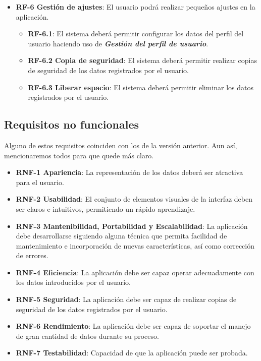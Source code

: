 \begin{itemize}
\begin{itemize}
\begin{itemize}
				\end{itemize}
		\end{itemize}
	\item \textbf{RF-6 Gestión de ajustes}: El usuario podrá realizar pequeños ajustes en la aplicación.
		\begin{itemize}
			\item \textbf{RF-6.1}: El sistema deberá permitir configurar los datos del perfil del usuario haciendo uso de \textbf{\textit{Gestión del perfil de usuario}}.
			\item \textbf{RF-6.2 Copia de seguridad}: El sistema deberá permitir realizar copias de seguridad de los datos registrados por el usuario.
			\item \textbf{RF-6.3 Liberar espacio}: El sistema deberá permitir eliminar los datos registrados por el usuario.
		\end{itemize}
\end{itemize}
\subsection{Requisitos no funcionales}
Alguno de estos requisitos coinciden con los de la versión anterior. Aun así, mencionaremos todos para que quede más claro.
\begin{itemize}
	\item \textbf{RNF-1 Apariencia}: La representación de los datos deberá ser atractiva para el usuario.
	\item \textbf{RNF-2 Usabilidad}: El conjunto de elementos visuales de la interfaz deben ser claros e intuitivos, permitiendo un rápido aprendizaje.
	\item \textbf{RNF-3  Mantenibilidad, Portabilidad y Escalabilidad}: La aplicación debe desarrollarse siguiendo alguna técnica que permita facilidad de mantenimiento e incorporación de nuevas características, así como corrección de errores.
	\item \textbf{RNF-4 Eficiencia}: La aplicación debe ser capaz operar adecuadamente con los datos introducidos por el usuario.
	\item \textbf{RNF-5 Seguridad}: La aplicación debe ser capaz de realizar copias de seguridad de los datos registrados por el usuario.
	\item \textbf{RNF-6 Rendimiento}: La aplicación debe ser capaz de soportar el manejo de gran cantidad de datos durante su proceso.
	\item \textbf{RNF-7 Testabilidad}: Capacidad de que la aplicación puede ser probada.
\end{itemize}

